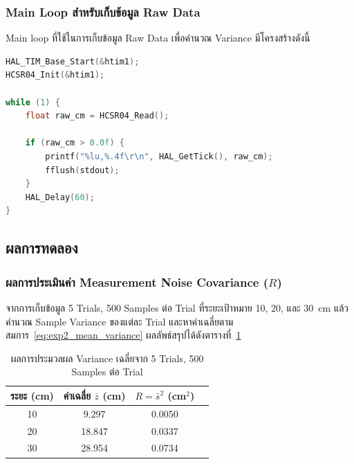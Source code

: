 \subsubsection{Main Loop สำหรับเก็บข้อมูล Raw Data}

Main loop ที่ใช้ในการเก็บข้อมูล Raw Data เพื่อคำนวณ Variance
มีโครงสร้างดังนี้

\begin{lstlisting}[language=C,
    caption={\texttt{main.c} --- Main Loop สำหรับส่ง Raw Distance ออก Serial},
    label={lst:main_raw}]
HAL_TIM_Base_Start(&htim1);
HCSR04_Init(&htim1);

while (1) {
    float raw_cm = HCSR04_Read();

    if (raw_cm > 0.0f) {
        printf("%lu,%.4f\r\n", HAL_GetTick(), raw_cm);
        fflush(stdout);
    }
    HAL_Delay(60);
}
\end{lstlisting}

\subsection{ผลการทดลอง}

\subsubsection{ผลการประเมินค่า Measurement Noise Covariance ($R$)}

จากการเก็บข้อมูล 5 Trials, 500 Samples ต่อ Trial ที่ระยะเป้าหมาย
10, 20, และ 30~cm แล้วคำนวณ Sample Variance ของแต่ละ Trial
และหาค่าเฉลี่ยตามสมการ~\eqref{eq:exp2_mean_variance}
ผลลัพธ์สรุปได้ดังตารางที่~\ref{tab:variance_results}

\begin{table}[htbp]
    \centering
    \caption{ผลการประมวลผล Variance เฉลี่ยจาก 5 Trials,
             500 Samples ต่อ Trial}
    \label{tab:variance_results}
    \begin{tabular}{cccc}
        \hline
        \textbf{ระยะ (cm)}
            & \textbf{ค่าเฉลี่ย $\bar{z}$ (cm)}
            & \textbf{$R = \bar{s}^2$ (cm$^2$)}\\
        \hline
        10 & 9.297  & 0.0050\\
        20 & 18.847 & 0.0337\\
        30 & 28.954 & 0.0734\\
        \hline
    \end{tabular}
\end{table}

